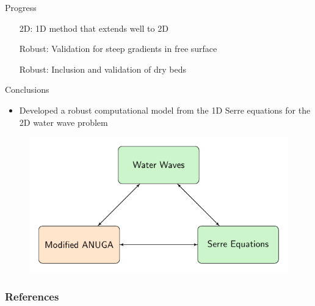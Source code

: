\documentclass[]{beamer}
\begin{document}
\begin{frame}{Progress}
	\begin{itemize}
		\item[2D:] 1D method that extends well to 2D \checkmark
		\item[Robust:] Validation for steep gradients in free surface \checkmark
		\item[Robust:] Inclusion and validation of dry beds \checkmark
	\end{itemize}	
\end{frame}

\begin{frame}{Conclusions}
	\begin{itemize}
		\item Developed a robust computational model from the 1D Serre equations for the 2D water wave problem
	\end{itemize}
	\begin{figure}
		\includegraphics[width=\textwidth]{./Pics/ModelDiagrams/FlowChartSerre12G3O.pdf}
	\end{figure}
\end{frame}


\begin{frame}[allowframebreaks]
	\frametitle{References}
	
	
\end{frame}
\end{document}
